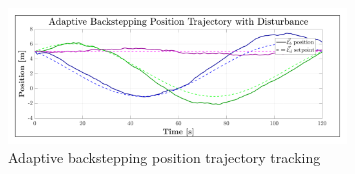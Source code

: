 \begin{figure}[hbtp]
\vspace{-6pt}
\centering
\includegraphics[width=0.8\textwidth]{graphs/ABC_Position_Trajectory}
\vspace{-12pt}
\caption{Adaptive backstepping position trajectory tracking}
\label{fig:ABC_Position_Trajectory}
\vspace{-16pt}
\end{figure}
